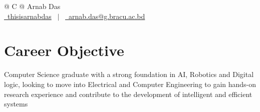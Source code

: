 \documentclass[a4paper,12pt]{article}
\begin{document}
\pagestyle{empty}



\begin{tabularx}{\linewidth}{@{} C @{}}
    \Huge{Arnab Das}                                                                                            \\[7.5pt]
    \href{https://github.com/thisisarnabdas}{\raisebox{-0.05\height}\faGithub\ thisisarnabdas} \ $|$ \
    \href{mailto:arnab.das@g.bracu.ac.bd}{\raisebox{-0.05\height}\faEnvelope \ arnab.das@g.bracu.ac.bd} \\
\end{tabularx}


\section{Career Objective}

Computer Science graduate with a strong foundation in AI, Robotics and Digital logic, looking to move into Electrical and Computer Engineering to gain hands-on research experience and contribute to the development of intelligent and efficient systems
\end{document}
